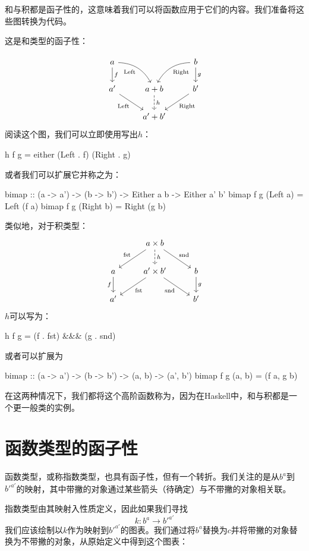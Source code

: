 \documentclass[DaoFP]{subfiles}
\begin{document}
和与积都是函子性的，这意味着我们可以将函数应用于它们的内容。我们准备将这些图转换为代码。

这是和类型的函子性：

\[
 \begin{tikzcd}
 a
 \arrow[d, "f"]
 \arrow[dr,  bend left, "\text{Left}"']
  && b
 \arrow[d, "g"]
 \arrow[dl, bend right, "\text{Right}"]
 \\
 a'
 \arrow[rd, "\text{Left}"']
&a + b
\arrow[d, dashed, "h"]
& b'
\arrow[ld, "\text{Right}"]
\\
& a' + b'
 \end{tikzcd}
\]
阅读这个图，我们可以立即使用写出$h$：
\begin{haskell}
h f g = either (Left . f) (Right . g)
\end{haskell}
或者我们可以扩展它并称之为：
\begin{haskell}
bimap :: (a -> a') -> (b -> b') -> Either a b -> Either a' b'
bimap f g (Left  a) = Left  (f a)
bimap f g (Right b) = Right (g b)
\end{haskell}
类似地，对于积类型：
\[
 \begin{tikzcd}
 & a \times b
\arrow[d, dashed, "h"]
 \arrow[dl,  "\text{fst}"']
 \arrow[dr,   "\text{snd}"]
\\
a
\arrow[d, "f"']
&a' \times b'
 \arrow[dl,  "\text{fst}"]
  \arrow[dr,   "\text{snd}"']
& b
\arrow[d, "g"]
\\
a' && b'
 \end{tikzcd}
\]
$h$可以写为：
\begin{haskell}
h f g = (f . fst) &&& (g . snd)
\end{haskell}
或者可以扩展为
\begin{haskell}
bimap :: (a -> a') -> (b -> b') -> (a, b) -> (a', b')
bimap f g (a, b) = (f a, g b)
\end{haskell}
在这两种情况下，我们都将这个高阶函数称为，因为在Haskell中，和与积都是一个更一般类的实例。

\section{函数类型的函子性}

函数类型，或称指数类型，也具有函子性，但有一个转折。我们关注的是从$b^a$到$b'^{a'}$的映射，其中带撇的对象通过某些箭头（待确定）与不带撇的对象相关联。

指数类型由其映射入性质定义，因此如果我们寻找
\[k \colon b^a \to b'^{a'} \]
我们应该绘制以$k$作为映射到$b'^{a'}$的图表。我们通过将$b^a$替换为$c$并将带撇的对象替换为不带撇的对象，从原始定义中得到这个图表：
\end{document}
